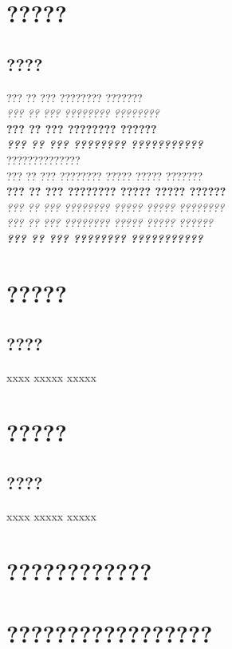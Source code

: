 \documentclass[a4paper]{book}
\begin{document}
\frontmatter
{}
\tableofcontents

\mainmatter
\chapter{?????}
\section{????}


\noindent
??? ?? ??? ???????? ???????\\
{\itshape ??? ?? ??? ???????? ????????} \\
{\bfseries ??? ?? ??? ???????? ?????? } \\
{\bfseries\itshape ??? ?? ??? ???????? ???????????} \\

?????????????? \LaTeXe{}\\
??? ?? ??? ???????? ????? ????? ???????\\
\textbf{??? ?? ??? ???????? ????? ????? ??????}\\
\textit{??? ?? ??? ???????? ????? ????? ????????}\\
\textsl{??? ?? ??? ???????? ????? ????? ??????}\\
\textbf{\textit{??? ?? ??? ???????? ???????????}}\\

\chapter{?????}
\section{????}
xxxx xxxxx xxxxx
\chapter{?????}
\section{????}
xxxx xxxxx xxxxx


\begin{appendices}
\renewcommand*{\thechapter}{\thaiAlph{chapter}}
\chapter{????????????} %
\chapter{?????????????????} %
\end{appendices}
\end{document}
